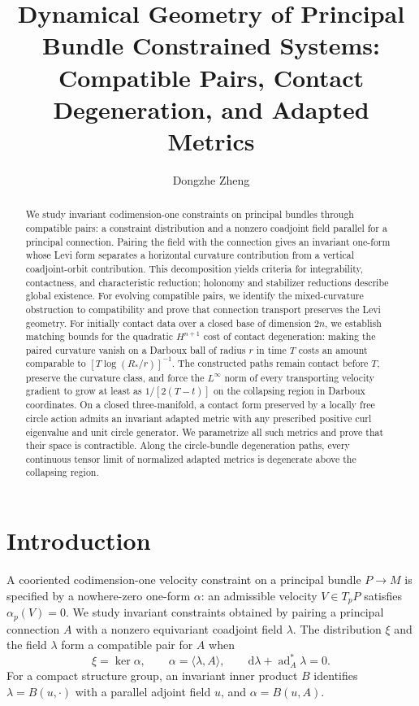 \documentclass[11pt,a4paper]{article}
\title{Dynamical Geometry of Principal Bundle Constrained Systems:\\Compatible Pairs, Contact Degeneration, and Adapted Metrics}
\author{Dongzhe Zheng}
\date{}
\numberwithin{equation}{section}
\theoremstyle{definition}
\theoremstyle{remark}
\newcommand{\dd}{\mathrm d}
\DeclareMathOperator{\ad}{ad}
\begin{document}
\maketitle
\begin{abstract}
We study invariant codimension-one constraints on principal bundles through
compatible pairs: a constraint distribution and a nonzero coadjoint field
parallel for a principal connection. Pairing the field with the connection
gives an invariant one-form whose Levi form separates a horizontal curvature
contribution from a vertical coadjoint-orbit contribution. This decomposition
yields criteria for integrability, contactness, and characteristic reduction;
holonomy and stabilizer reductions describe global existence. For evolving
compatible pairs, we identify the mixed-curvature obstruction to compatibility
and prove that connection transport preserves the Levi geometry.
For initially contact data over a closed base of dimension $2n$, we establish
matching bounds for the quadratic $H^{n+1}$ cost of contact degeneration:
making the paired curvature vanish on a Darboux ball of radius $r$ in time $T$
costs an amount comparable to $[T\log(R_*/r)]^{-1}$. The constructed paths
remain contact before $T$, preserve the curvature class, and force the
$L^\infty$ norm of every transporting velocity gradient to grow at least
as $1/[2(T-t)]$ on the
collapsing region in Darboux coordinates. On a closed three-manifold,
a contact form preserved by a locally free circle action admits an invariant
adapted metric with any prescribed positive curl eigenvalue and unit circle
generator. We parametrize all such metrics and prove that their space is
contractible. Along the circle-bundle degeneration paths, every continuous
tensor limit of normalized adapted metrics is degenerate above the collapsing
region.
\end{abstract}

\section{Introduction}

A cooriented codimension-one velocity constraint on a principal bundle $P\to M$ is
specified by a nowhere-zero one-form $\alpha$: an admissible velocity
$V\in T_pP$ satisfies $\alpha_p(V)=0$. We study invariant constraints
obtained by pairing a principal connection $A$ with a nonzero equivariant
coadjoint field $\lambda$. The distribution $\xi$ and the field $\lambda$
form a compatible pair for $A$ when
\[
 \xi=\ker\alpha,\qquad \alpha=\langle\lambda,A\rangle,\qquad
 \dd\lambda+\ad_A^*\lambda=0.
\]
For a compact structure group, an invariant inner product $B$ identifies
$\lambda=B(u,\cdot)$ with a parallel adjoint field $u$, and
$\alpha=B(u,A)$.
\end{document}
